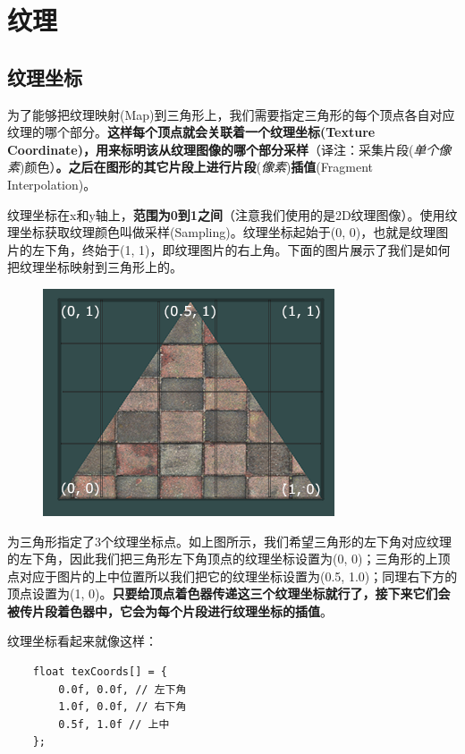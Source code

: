 \documentclass[UTF8,a4paper,12pt]{ctexbook}
\begin{document}
			
		
		
		
		
		
		

	\section{纹理}
		\subsection{纹理坐标}
			为了能够把纹理映射(Map)到三角形上，我们需要指定三角形的每个顶点各自对应纹理的哪个部分。\textbf{这样每个顶点就会关联着一个纹理坐标(Texture Coordinate)，用来标明该从纹理图像的哪个部分采样}（译注：采集片段(\textit{单个像素})颜色）\textbf{。之后在图形的其它片段上进行片段}(\textit{像素})\textbf{插值}(Fragment Interpolation)。
			
			纹理坐标在x和y轴上，\textbf{范围为0到1之间}（注意我们使用的是2D纹理图像）。使用纹理坐标获取纹理颜色叫做采样(Sampling)。纹理坐标起始于(0, 0)，也就是纹理图片的左下角，终始于(1, 1)，即纹理图片的右上角。下面的图片展示了我们是如何把纹理坐标映射到三角形上的。
			
			\begin{figure}[H]
				\centering
				\includegraphics[width=.7\linewidth]{tex_coords}
			\end{figure}
			
			为三角形指定了3个纹理坐标点。如上图所示，我们希望三角形的左下角对应纹理的左下角，因此我们把三角形左下角顶点的纹理坐标设置为(0, 0)；三角形的上顶点对应于图片的上中位置所以我们把它的纹理坐标设置为(0.5, 1.0)；同理右下方的顶点设置为(1, 0)。\textbf{只要给顶点着色器传递这三个纹理坐标就行了，接下来它们会被传片段着色器中，它会为每个片段进行纹理坐标的插值}。
			
			纹理坐标看起来就像这样：
			\begin{lstlisting}
	float texCoords[] = {
	    0.0f, 0.0f, // 左下角
	    1.0f, 0.0f, // 右下角
	    0.5f, 1.0f // 上中
	};		
			\end{lstlisting}
			
\end{document}
